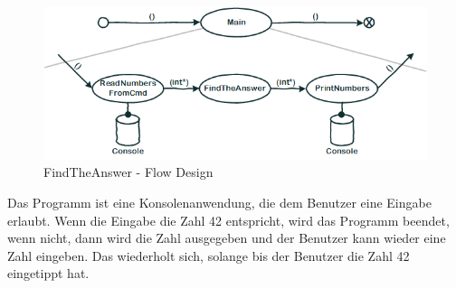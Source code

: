\begin{figure}[H]
	\centering
	\includegraphics[width=\linewidth]{./img/FlowDesign2.png}
	\caption{FindTheAnswer - Flow Design}
\end{figure}




\bigskip
Das Programm ist eine Konsolenanwendung, die dem Benutzer eine Eingabe erlaubt.
Wenn die Eingabe die Zahl 42 entspricht, wird das Programm beendet, wenn nicht,
dann wird die Zahl ausgegeben und der Benutzer kann wieder eine Zahl eingeben.
Das wiederholt sich, solange bis der Benutzer die Zahl 42 eingetippt hat.


